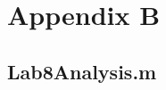 \chapter{Appendix B}

\section{Lab8Analysis.m} 
\label{sec:analysis_code}

\inputminted{matlab}{Code/Lab8_Analysis.m}
\label{listing:data_analysis_script}